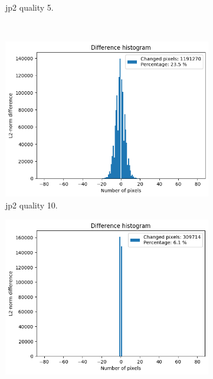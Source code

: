 \begin{figure}[htb]
\begin{subfigure}[b]{0.49\textwidth}
            \caption{\gls{jp2} quality 5.}
            \label{fig:img_quality_histogram_5}
        \end{subfigure}
        \\
        \begin{subfigure}[b]{0.49\textwidth}
            \centering
            \includegraphics[width=\textwidth]{doc/thesis/0_figures/compare_quality/set1/histograms/jp2_10_diff_histogram.png}
            \caption{\gls{jp2} quality 10.}
            \label{fig:img_quality_histogram_10}
        \end{subfigure}
        \begin{subfigure}[b]{0.49\textwidth}
            \centering
            \includegraphics[width=\textwidth]{doc/thesis/0_figures/compare_quality/set1/histograms/jp2_100_diff_histogram.png}

\end{subfigure}
\end{figure}
